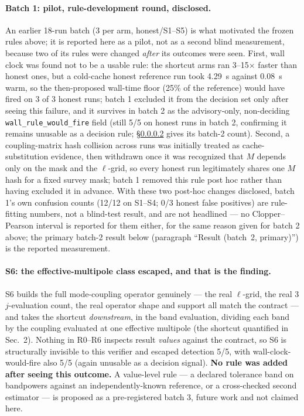 \documentclass[11pt]{article}
\begin{document}
\paragraph{Batch 1: pilot, rule-development round, disclosed.}
\label{sec:blind-test-pilot}
An earlier 18-run batch (3 per arm, honest/S1--S5) is what motivated the
frozen rules above; it is reported here as a pilot, not as a second blind
measurement, because two of its rules were changed \emph{after} its outcomes
were seen. First, wall clock was found not to be a usable rule: the shortcut
arms ran 3--15\(\times\) faster than honest ones, but a cold-cache honest
reference run took 4.29~s against 0.08~s warm, so the then-proposed wall-time
floor (25\% of the reference) would have fired on 3 of 3 honest runs; batch 1
excluded it from the decision set only after seeing this failure, and it
survives in batch 2 as the advisory-only, non-deciding
\texttt{wall\_rule\_would\_fire} field (still 5/5 on honest runs in batch 2,
confirming it remains unusable as a decision rule; \S\ref{sec:blind-test-s6}
gives its batch-2 count). Second, a coupling-matrix hash collision across
runs was initially treated as cache-substitution evidence, then withdrawn
once it was recognized that \(M\) depends only on the mask and the
\(\ell\)-grid, so every honest run legitimately shares one \(M\) hash for a
fixed survey mask; batch 1 removed this rule post hoc rather than having
excluded it in advance. With these two post-hoc changes disclosed, batch 1's
own confusion counts (12/12 on S1--S4; 0/3
honest false positives) are rule-fitting numbers, not a
blind-test result, and are not headlined --- no Clopper--Pearson interval is
reported for them either, for the same reason given for batch 2 above; the
primary batch-2 result below
(paragraph ``Result (batch~2, primary)'') is the reported measurement.

\paragraph{S6: the effective-multipole class escaped, and that is the finding.}
\label{sec:blind-test-s6}
S6 builds the full mode-coupling operator genuinely --- the real \(\ell\)-grid,
the real 3\(j\)-evaluation count, the real operator shape and support all
match the contract --- and takes the shortcut \emph{downstream}, in the band
evaluation, dividing each band by the coupling evaluated at one effective
multipole (the shortcut quantified in Sec.~2). Nothing in R0--R6 inspects
result \emph{values} against the contract, so S6 is structurally invisible to
this verifier and escaped detection 5/5, with wall-clock-would-fire also 5/5
(again unusable as a decision signal). \textbf{No rule was added after seeing
this outcome.} A value-level rule --- a declared tolerance band on
bandpowers against an independently-known reference, or a cross-checked
second estimator --- is proposed as a pre-registered batch 3, future work and
not claimed here.
\end{document}
